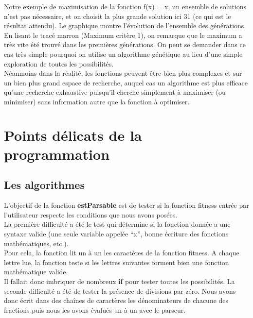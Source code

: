 \documentclass[a4paper,11pt]{article}
\begin{document}
			Notre exemple de maximisation de la fonction f(x) = x, un ensemble de solutions n’est pas nécessaire, et on choisit la plus grande solution ici 31 (ce qui est le résultat attendu).
			Le graphique montre l’évolution de l’ensemble des générations.
			En lisant le tracé marron (Maximum critère 1), on remarque que le maximum a très vite été trouvé dans les premières générations.
			On peut se demander dans ce cas très simple pourquoi on utilise un algorithme génétique au lieu d’une simple exploration de toutes les possibilités.\\
			Néanmoins dans la réalité, les fonctions peuvent être bien plus complexes et sur un bien plus grand espace de recherche, auquel cas un algorithme est plus efficace qu’une recherche exhaustive puisqu’il cherche simplement à maximiser (ou minimiser) sans information autre que la fonction à optimiser.
		
		
		\section{Points délicats de la programmation}
		\subsection{Les algorithmes }
			L’objectif de la fonction \textbf{estParsable} est de tester si la fonction fitness entrée par l’utilisateur respecte les conditions que nous avons posées.\\

			La première difficulté a été le test qui détermine si la fonction donnée a une syntaxe valide (une seule variable appelée “x”, bonne écriture des fonctions mathématiques, etc.).\\
			Pour cela, la fonction lit  un à un les caractères de la fonction fitness. A chaque lettre lue, la fonction teste si les lettres suivantes forment bien une fonction mathématique valide. \\
			Il fallait donc imbriquer de nombreux \textbf{if} pour tester toutes les possibilités. La seconde difficulté a été de tester la présence de divisions par zéro. Nous avons donc écrit dans des chaînes de caractères les dénominateurs de chacune des fractions puis nous les avons évalués un à un avec le parseur.\\
\end{document}
